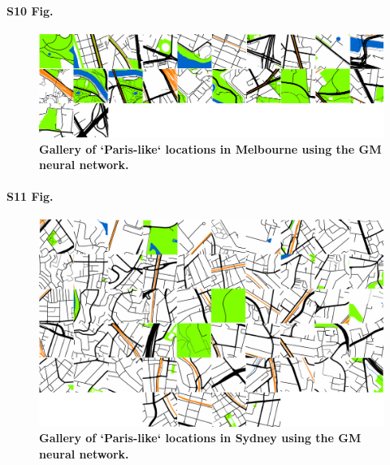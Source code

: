 \documentclass[10pt,letterpaper]{article}
\begin{document}
\paragraph*{S10 Fig.}
\begin{figure}[!htbp]
\centering   
\includegraphics[scale=0.19]{Images/PlosOne/Fig10.png}   
\caption{\bf Gallery of `Paris-like` locations in Melbourne using the GM neural network.}    
 \label{fig:gm_mel_gallery} 
\end{figure} 

\paragraph*{S11 Fig.}
\begin{figure}[!htbp]
\centering   
\includegraphics[scale=0.19]{Images/PlosOne/Fig11.png}   
\caption{\bf Gallery of `Paris-like` locations in Sydney using the GM neural network.}    
 \label{fig:gm_syd_gallery}  
\end{figure} 
\end{document}

